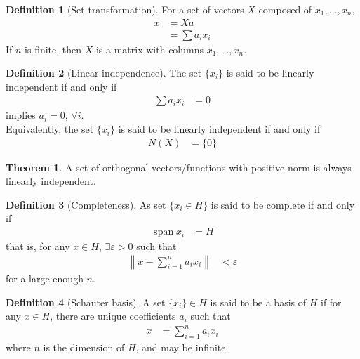 \documentclass[titlepage, fleqn, a4paper, 12pt, twoside]{article}
\theoremstyle{definition}
\newtheorem{definition}{Definition}
\theoremstyle{theorem}
\newtheorem{theorem}{Theorem}
\DeclareMathOperator{\vspan}{\mathrm{span}}
\begin{document}
\begin{definition}[Set transformation]
	For a set of vectors $X$ composed of $x_1,\dots,x_n$,
	\begin{align*}
		x &= X a\\
		&= \sum a_i x_i
	\end{align*}
	If $n$ is finite, then $X$ is a matrix with columns $x_1,\dots,x_n$.
\end{definition}

\begin{definition}[Linear independence]
	The set $\{x_i\}$ is said to be linearly independent if and only if
	\begin{align*}
		\sum a_i x_i &= 0
	\end{align*}
	implies $a_i = 0$, $\forall i$.\\
	Equivalently, the set $\{x_i\}$ is said to be linearly independent if and only if
	\begin{align*}
		N(X) &= \{0\}
	\end{align*}
\end{definition}

\begin{theorem}
	A set of orthogonal vectors/functions with positive norm is always linearly independent.
\end{theorem}

\begin{definition}[Completeness]
	As set $\{x_i \in H\}$ is said to be complete if and only if
	\begin{align*}
		\vspan{x_i} &= H
	\end{align*}
	that is, for any $x \in H$, $\exists \varepsilon > 0$ such that
	\begin{align*}
		\left\| x - \sum\limits_{i = 1}^{n} a_i x_i \right\| &< \varepsilon
	\end{align*}
	for a large enough $n$.
\end{definition}

\begin{definition}[Schauter basis]
	A set $\{x_i\} \in H$ is said to be a basis of $H$ if for any $x \in H$, there are unique coefficients $a_i$ such that
	\begin{align*}
		x &= \sum\limits_{i = 1}^{n} a_i x_i
	\end{align*}
	where $n$ is the dimension of $H$, and may be infinite.
\end{definition}

\clearpage
\printindex
\end{document}
